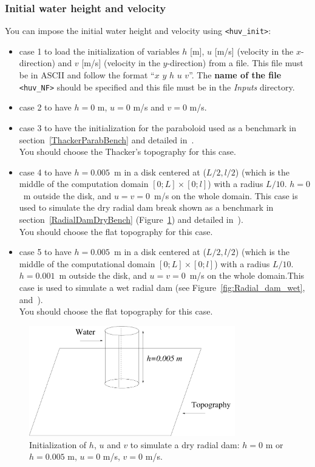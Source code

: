 \documentclass[a4paper, 11pt]{article}
\begin{document}
\subsubsection{Initial water height and velocity}
You can impose the initial water height and velocity using \texttt{<huv\_init>}:
\begin{itemize}
	\item case 1 to load the initialization of variables $h$  [m], $u$ [m/s] (velocity in the $x$-direction) and $v$ [m/s] (velocity in the $y$-direction) from a file. This file must be in ASCII and follow the format
``$x$ $y$ $h$ $u$ $v$''. The \textbf{name of the file} \texttt{<huv\_NF>} should be specified and this file must be in the \textit{Inputs} directory. 
	\item case 2 to have $h=0$ m, $u=0$ m/s and $v=0$ m/s. 
	\item case 3 to have the initialization for the paraboloid used as a benchmark in section~\ref{ThackerParabBench}
and detailed in~\citep[§~4.2.2]{Delestre13}.\\
You should choose the Thacker's topography for this case.
	\item case 4 to have $h=0.005$~m in a disk centered at ($L/2,l/2$) (which is the middle of the computation domain $[0;L] \times [0; l]$) with a radius $L/10$. $h = 0$~m outside the disk, and $u = v = 0$~m/s on the whole domain. This case is used to simulate the dry radial dam break shown as a benchmark in 
section~\ref{RadialDamDryBench} (Figure~\ref{fig:Radial_dam_dry})
and detailed in~\citep[§~4.1.2]{Delestre13}).\\ 
You should choose the flat topography for this case.
	\item case 5 to have $h=0.005$~m in a disk centered at ($L/2,l/2$) (which is the middle of the computational domain $[0;L] \times [0; l]$) with a radius $L/10$. $h = 0.001$~m outside the disk, and $u = v = 0$~m/s on the whole domain.This case is used to simulate a wet radial dam (see Figure~\ref{fig:Radial_dam_wet}, and~\citep[§~4.1.1]{Delestre13}). \\
You should choose the flat topography for this case.
 \end{itemize}

\begin{figure}[htbp]
\begin{center}
\includegraphics[width=0.8\textwidth]{Figures_FullSWOF_2D/Radial_dam_dry}
\caption{Initialization of $h$, $u$ and $v$ to simulate a dry radial dam:
$h=0$ m or $h=0.005$ m, $u=0$ m/s, $v=0$ m/s.}
\label{fig:Radial_dam_dry}
\end{center}
\end{figure}
\end{document}
